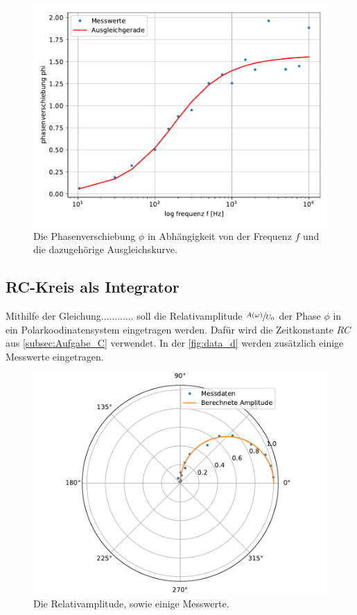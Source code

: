\begin{figure}
  \centering
  \includegraphics{content/data_c_ausgleich.pdf}
  \caption{Die Phasenverschiebung $\phi$ in Abhängigkeit von der Frequenz $f$ und die dazugehörige Ausgleichskurve.}
  \label{fig:data_c}
\end{figure}

\subsection{RC-Kreis als Integrator}
\label{Aufgabe_d}
Mithilfe der Gleichung............ soll die Relativamplitude $\sfrac{A(\omega)}{U_0}$ der Phase $\phi$ in ein Polarkoodinatensystem eingetragen werden.
Dafür wird die Zeitkonstante $RC$ aus \autoref{subsec:Aufgabe_C} verwendet.
In der \autoref{fig:data_d} werden zusätzlich einige Messwerte eingetragen.

\begin{figure}
  \centering
  \includegraphics{content/data_d_ausgleich.pdf}
  \caption{Die Relativamplitude, sowie einige Messwerte.}
  \label{fig:data_d}
\end{figure}

